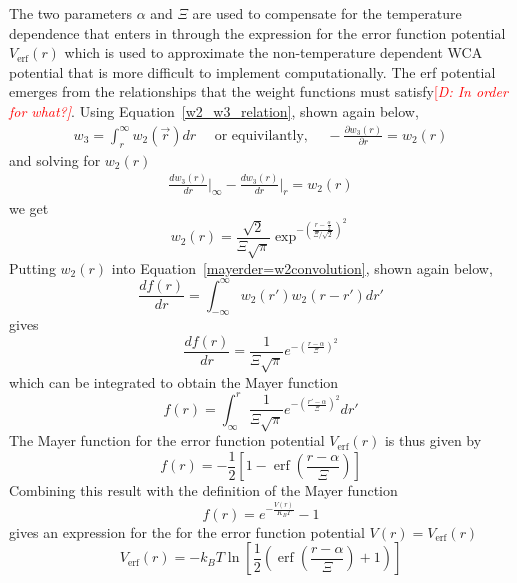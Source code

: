 \documentclass[double,12pt]{beavtex}
\newcommand\davidsays[1]{\textcolor{red}{[\it D: #1]}}
\begin{document}
The two parameters $\alpha$ and $\Xi$ are used to compensate for the 
temperature dependence that enters in through the expression for the 
error function potential $V_{\operatorname{erf}}(r)$ which is used to approximate the
non-temperature dependent WCA potential that is more difficult to 
implement computationally. The erf potential emerges from the relationships
that the weight functions must satisfy\davidsays{In order for what?}.
Using Equation~\ref{w2_w3_relation}, shown again below, 
\begin{align}
  w_{3}=\int_{r}^{\infty}{w_{2}(\vec{r})dr}\mbox{~~~~or equivilantly,~~~~}-\frac{\partial{w_3(r)}}{\partial{r}}=w_2(r)
\end{align}
and solving for $w_2(r)$
\begin{align}
  \frac{dw_3(r)}{dr}\bigg|_{\infty}-\frac{dw_3(r)}{dr}\bigg|_{r}=w_2(r)
\end{align} 
we get \begin{equation}{ w_2(r)=\frac{\sqrt{2}}{\Xi\sqrt\pi}\exp^{-\left(\frac{r-\frac{\alpha}{2}}{\Xi/\sqrt{2}}\right)^2} }\end{equation} %
Putting $w_2(r)$ into Equation~\ref{mayerder=w2convolution}, shown again below, 
\begin{displaymath}{\frac{df(r)}{dr}=\int_{-\infty}^{\infty}{w_2(r')w_2(r-r')dr'}}\end{displaymath}
gives
\begin{equation}{\frac{df(r)}{dr}=\frac{1}{\Xi\sqrt{\pi}}e^{-\left(\frac{r-\alpha}{\Xi}\right)^2}}\end{equation} 
which can be integrated to obtain the Mayer function
\begin{equation}{f(r)=\int_{\infty}^r{ \frac{1}{\Xi\sqrt{\pi}}e^{-\left(\frac{r'-\alpha}{\Xi}\right)^2}{dr'}}}\end{equation} 
The Mayer function for the error function potential $V_{\operatorname{erf}}(r)$ is thus 
given by
\begin{equation}{f(r)=-\frac{1}{2}\left[1-\operatorname{\operatorname{erf}}\left(\frac{r-\alpha}{\Xi}\right)\right]}\end{equation} 
Combining this result with the definition of the Mayer function \begin{displaymath}f(r)=e^{-\frac{V(r)}{K_BT}}-1\end{displaymath} 
gives an expression for the for the error function potential  $V(r)=V_{\operatorname{erf}}(r)$ 
\begin{equation}
	V_{\operatorname{erf}}(r)=-k_BT\ln\left[\frac{1}{2}\left(\operatorname{erf}\left(\frac{r-\alpha}{\Xi}\right)+1\right)\right]
\end{equation}  
\end{document}
